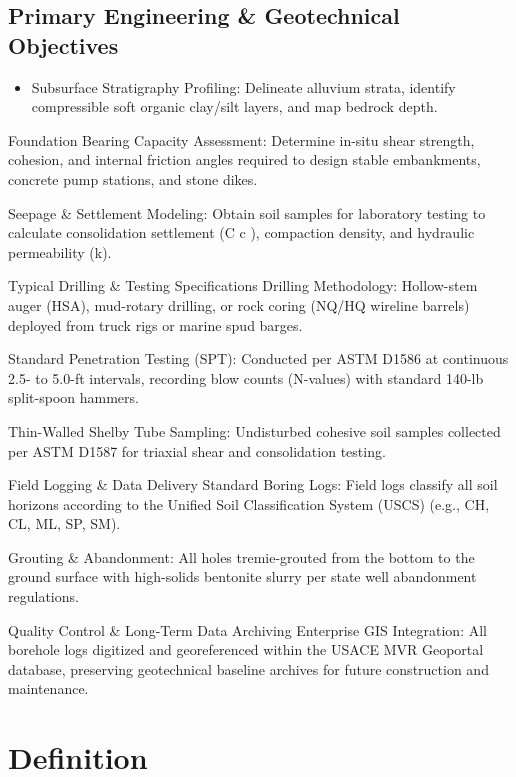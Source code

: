\documentclass[
  letterpaper,
  DIV=11,
  numbers=noendperiod]{scrreprt}
\providecommand{\tightlist}{%
  \setlength{\itemsep}{0pt}\setlength{\parskip}{0pt}}
\begin{document}
\subsection{Primary Engineering \& Geotechnical
Objectives}\label{primary-engineering-geotechnical-objectives}

\begin{itemize}
\tightlist
\item
  Subsurface Stratigraphy Profiling: Delineate alluvium strata, identify
  compressible soft organic clay/silt layers, and map bedrock depth.
\end{itemize}

Foundation Bearing Capacity Assessment: Determine in-situ shear
strength, cohesion, and internal friction angles required to design
stable embankments, concrete pump stations, and stone dikes.

Seepage \& Settlement Modeling: Obtain soil samples for laboratory
testing to calculate consolidation settlement (C c \hspace{0pt} ),
compaction density, and hydraulic permeability (k).

Typical Drilling \& Testing Specifications Drilling Methodology:
Hollow-stem auger (HSA), mud-rotary drilling, or rock coring (NQ/HQ
wireline barrels) deployed from truck rigs or marine spud barges.

Standard Penetration Testing (SPT): Conducted per ASTM D1586 at
continuous 2.5- to 5.0-ft intervals, recording blow counts (N-values)
with standard 140-lb split-spoon hammers.

Thin-Walled Shelby Tube Sampling: Undisturbed cohesive soil samples
collected per ASTM D1587 for triaxial shear and consolidation testing.

Field Logging \& Data Delivery Standard Boring Logs: Field logs classify
all soil horizons according to the Unified Soil Classification System
(USCS) (e.g., CH, CL, ML, SP, SM).

Grouting \& Abandonment: All holes tremie-grouted from the bottom to the
ground surface with high-solids bentonite slurry per state well
abandonment regulations.

Quality Control \& Long-Term Data Archiving Enterprise GIS Integration:
All borehole logs digitized and georeferenced within the USACE MVR
Geoportal database, preserving geotechnical baseline archives for future
construction and maintenance.

\section{Definition}\label{definition-17}
\end{document}
